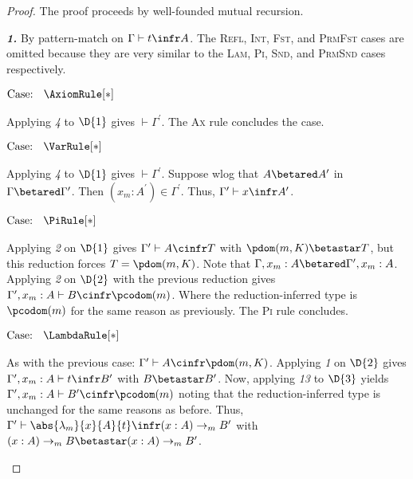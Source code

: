 \begin{proof}
    The proof proceeds by well-founded mutual recursion.

    \noindent \textbf{\textit{1.}} By pattern-match on $\Gamma \vdash t \infr A$.
    The \textsc{Refl}, \textsc{Int}, \textsc{Fst}, and \textsc{PrmFst} cases are omitted because they are very similar to the \textsc{Lam}, \textsc{Pi}, \textsc{Snd}, and \textsc{PrmSnd} cases respectively.

    $\text{Case: }\begin{array}{c} \AxiomRule[*] \end{array}$
    \begin{proofcase}
        Applying \textit{4} to $\D{1}$ gives $\vdash \Gamma^\prime$.
        The \textsc{Ax} rule concludes the case.
    \end{proofcase}

    $\text{Case: }\begin{array}{c} \VarRule[*] \end{array}$
    \begin{proofcase}
        Applying \textit{4} to $\D{1}$ gives $\vdash \Gamma^\prime$.
        Suppose wlog that $A \betared A^\prime$ in $\Gamma \betared \Gamma^\prime$.
        Then $(x_m : A^\prime) \in \Gamma^\prime$.
        Thus, $\Gamma^\prime \vdash x \infr A^\prime$.
    \end{proofcase}

    $\text{Case: }\begin{array}{c} \PiRule[*] \end{array}$
    \begin{proofcase}
        Applying \textit{2} on $\D{1}$ gives $\Gamma^\prime \vdash A \cinfr T$ with $\pdom(m, K) \betastar T$, but this reduction forces $T = \pdom(m, K)$.
        Note that $\Gamma, x_m : A \betared \Gamma^\prime, x_m : A$.
        Applying \textit{2} on $\D{2}$ with the previous reduction gives $\Gamma^\prime, x_m : A \vdash B \cinfr \pcodom(m)$.
        Where the reduction-inferred type is $\pcodom(m)$ for the same reason as previously.
        The \textsc{Pi} rule concludes.
    \end{proofcase}

    $\text{Case: }\begin{array}{c} \LambdaRule[*] \end{array}$
    \begin{proofcase}
        As with the previous case: $\Gamma^\prime \vdash A \cinfr \pdom(m, K)$.
        Applying \textit{1} on $\D{2}$ gives $\Gamma^\prime, x_m : A \vdash t \infr B^\prime$ with $B \betastar B^\prime$.
        Now, applying \textit{13} to $\D{3}$ yields $\Gamma^\prime, x_m : A \vdash B^\prime \cinfr \pcodom(m)$ noting that the reduction-inferred type is unchanged for the same reasons as before.
        Thus, $\Gamma^\prime \vdash \abs{\lambda_m}{x}{A}{t} \infr (x : A) \to_m B^\prime$ with $(x : A) \to_m B \betastar (x : A) \to_m B^\prime$.
    \end{proofcase}


\end{proof}
